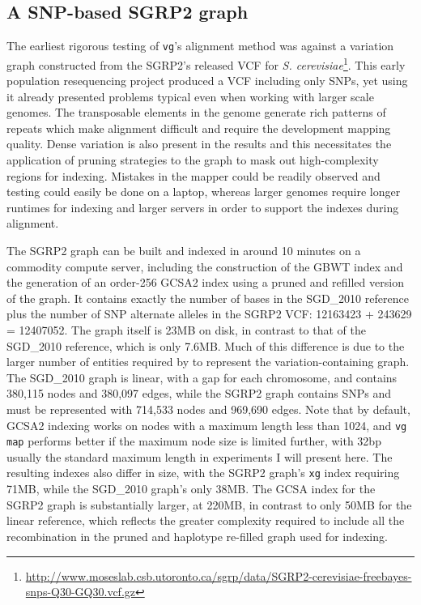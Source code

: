 \subsection{A SNP-based SGRP2 graph}
\label{sec:SGRP2_graph}
The earliest rigorous testing of {\tt vg}'s alignment method was against a variation graph constructed from the SGRP2's released VCF for \emph{S. cerevisiae}\footnote{\url{http://www.moseslab.csb.utoronto.ca/sgrp/data/SGRP2-cerevisiae-freebayes-snps-Q30-GQ30.vcf.gz}}.
This early population resequencing project produced a VCF including only SNPs, yet using it already presented problems typical even when working with larger scale genomes.
The transposable elements in the genome generate rich patterns of repeats which make alignment difficult and require the development mapping quality.
Dense variation is also present in the results and this necessitates the application of pruning strategies to the graph to mask out high-complexity regions for indexing.
Mistakes in the mapper could be readily observed and testing could easily be done on a laptop, whereas larger genomes require longer runtimes for indexing and larger servers in order to support the indexes during alignment.

The SGRP2 graph can be built and indexed in around 10 minutes on a commodity compute server, including the construction of the GBWT index and the generation of an order-256 GCSA2 index using a pruned and refilled version of the graph.
It contains exactly the number of bases in the SGD\_2010 reference plus the number of SNP alternate alleles in the SGRP2 VCF: 12163423 + 243629 = 12407052.
The graph itself is 23MB on disk, in contrast to that of the SGD\_2010 reference, which is only 7.6MB.
Much of this difference is due to the larger number of entities required by to represent the variation-containing graph.
The SGD\_2010 graph is linear, with a gap for each chromosome, and contains 380,115 nodes and 380,097 edges, while the SGRP2 graph contains SNPs and must be represented with 714,533 nodes and 969,690 edges.
Note that by default, GCSA2 indexing works on nodes with a maximum length less than 1024, and {\tt vg map} performs better if the maximum node size is limited further, with 32bp usually the standard maximum length in experiments I will present here.
The resulting indexes also differ in size, with the SGRP2 graph's {\tt xg} index requiring 71MB, while the SGD\_2010 graph's only 38MB.
The GCSA index for the SGRP2 graph is substantially larger, at 220MB, in contrast to only 50MB for the linear reference, which reflects the greater complexity required to include all the recombination in the pruned and haplotype re-filled graph used for indexing.

